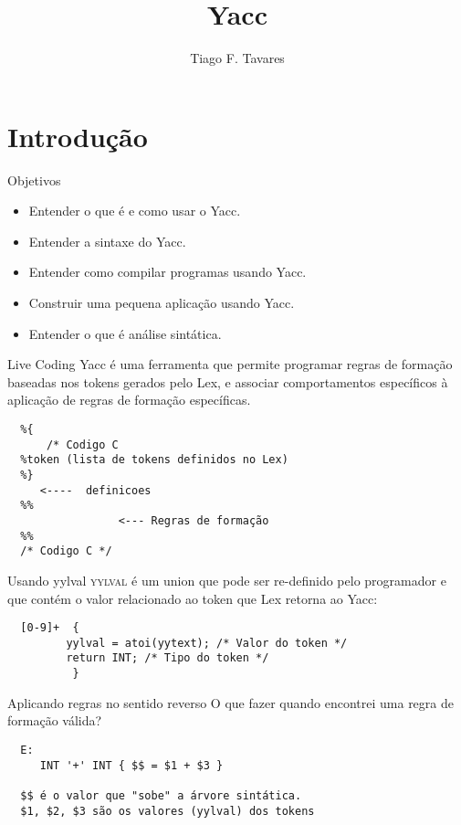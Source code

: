 \documentclass{beamer}
\title[07-Yacc]{Yacc}
\author{Tiago F. Tavares}
\institute{FEEC -- UNICAMP}
\date{}
\begin{document}
\begin{frame}
  \titlepage
\end{frame}


\section{Introdução}

\begin{frame}{Objetivos}
  \Large
  \begin{itemize}
    \item Entender o que é e como usar o Yacc.
    \item Entender a sintaxe do Yacc.
    \item Entender como compilar programas usando Yacc.
    \item Construir uma pequena aplicação usando Yacc.
    \item Entender o que é análise sintática.
  \end{itemize}
\end{frame}

\begin{frame}[fragile]{Live Coding}
  Yacc é uma ferramenta que permite programar regras de formação baseadas nos
  tokens gerados pelo Lex, e associar comportamentos específicos à aplicação de
  regras de formação específicas.
  \begin{verbatim}
  %{
      /* Codigo C
  %token (lista de tokens definidos no Lex)
  %}
     <----  definicoes
  %%
                 <--- Regras de formação
  %%
  /* Codigo C */
  \end{verbatim}
\end{frame}

\begin{frame}[fragile]{Usando yylval}
  \large
  \textsc{yylval} é um union que pode ser re-definido pelo programador e que contém o
  valor relacionado ao token que Lex retorna ao Yacc:

  \begin{verbatim}
  [0-9]+  {
         yylval = atoi(yytext); /* Valor do token */
         return INT; /* Tipo do token */
          }
  \end{verbatim}
\end{frame}

\begin{frame}[fragile]{Aplicando regras no sentido reverso}
  \large
  O que fazer quando encontrei uma regra de formação válida?
  \begin{verbatim}
  E:
     INT '+' INT { $$ = $1 + $3 }

  $$ é o valor que "sobe" a árvore sintática.
  $1, $2, $3 são os valores (yylval) dos tokens
  \end{verbatim}

\end{frame}
\end{document}
